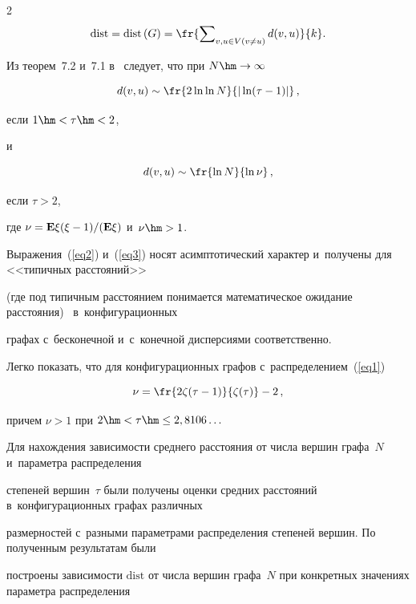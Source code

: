 \begin{multicols}{2}
\begin{equation*}
\mathrm{dist} = \mathrm{dist}\,(G) = \fr{\sum\nolimits_{v,u\in V(v\neq u)}d(v,u)}{k}.

\end{equation*}



Из теорем~7.2 и~7.1 в~\cite{Hof2} следует, что при $N\hm\rightarrow\infty$ 

\begin{equation}

\label{eq2}

d(v,u)\sim\fr{2\ln\ln N}{|\ln(\tau-1)|}\,,

\end{equation}

если $1\hm<\tau\hm<2$,

и

\begin{equation}

\label{eq3}

d(v,u)\sim\fr{\ln N}{\ln\nu}\,,

\end{equation}

если $\tau>2$, 

где $\nu={\bf E}\xi(\xi-1)/({\bf E}\xi)$ и~$\nu\hm>1$.

Выражения~(\ref{eq2}) и~(\ref{eq3}) носят асимптотический характер и~получены для <<типичных рас\-сто\-яний>>

(где под типичным рас\-сто\-яни\-ем понимается математическое ожидание рас\-сто\-яния)~\cite{Hof2} в~конфигурационных

графах с~бесконечной и~с~конечной дис\-пер\-си\-ями соответственно.

Легко показать, что для конфигурационных графов с~распределением~(\ref{eq1})

$$

\nu=\fr{2\zeta(\tau-1)}{\zeta(\tau)}-2\,,

$$

причем $\nu>1$ при $2\hm<\tau\hm\leq 2,8106\ldots$



Для нахождения зависимости среднего расстояния от числа вершин графа~$N$ и~па\-ра\-мет\-ра распределения

степеней вершин~$\tau$ были получены оценки средних расстояний в~конфигурационных графах различных

размерностей с~разными па\-ра\-мет\-ра\-ми распределения степеней вершин. По полученным результатам были

построены зависимости $\mathrm{dist}$ от чис\-ла вершин графа~$N$ при конкретных значениях па\-ра\-мет\-ра распределения


\end{multicols}
